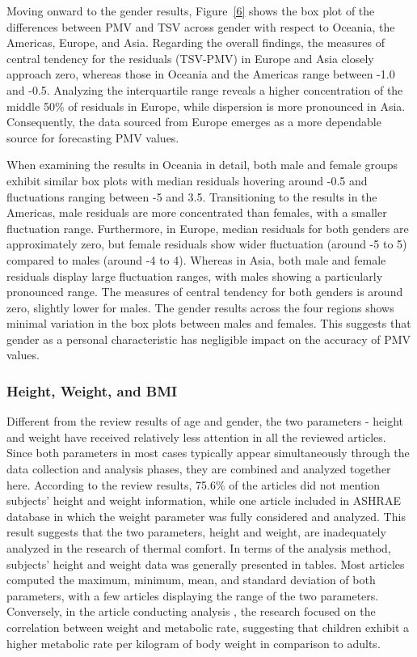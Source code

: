 \documentclass[final,3p,times,12pt]{elsarticle}
\begin{document}
Moving onward to the gender results, Figure~\ref{6} shows the box plot of the differences between PMV and TSV across gender with respect to Oceania, the Americas, Europe, and Asia. Regarding the overall findings, the measures of central tendency for the residuals (TSV-PMV) in Europe and Asia closely approach zero, whereas those in Oceania and the Americas range between -1.0 and -0.5. Analyzing the interquartile range reveals a higher concentration of the middle 50\% of residuals in Europe, while dispersion is more pronounced in Asia. Consequently, the data sourced from Europe emerges as a more dependable source for forecasting PMV values.

When examining the results in Oceania in detail, both male and female groups exhibit similar box plots with median residuals hovering around -0.5 and fluctuations ranging between -5 and 3.5. Transitioning to the results in the Americas, male residuals are more concentrated than females, with a smaller fluctuation range. Furthermore, in Europe, median residuals for both genders are approximately zero, but female residuals show wider fluctuation (around -5 to 5) compared to males (around -4 to 4). Whereas in Asia, both male and female residuals display large fluctuation ranges, with males showing a particularly pronounced range. The measures of central tendency for both genders is around zero, slightly lower for males. The gender results across the four regions shows minimal variation in the box plots between males and females. This suggests that gender as a personal characteristic has negligible impact on the accuracy of PMV values.

\subsubsection{Height, Weight, and BMI}

Different from the review results of age and gender, the two parameters - height and weight have received relatively less attention in all the reviewed articles. Since both parameters in most cases typically appear simultaneously through the data collection and analysis phases, they are combined and analyzed together here. According to the review results, 75.6\% of the articles did not mention subjects’ height and weight information, while one article included in ASHRAE database in which the weight parameter was fully considered and analyzed. This result suggests that the two parameters, height and weight, are inadequately analyzed in the research of thermal comfort. In terms of the analysis method, subjects’ height and weight data was generally presented in tables. Most articles \cite{dedearFieldExperimentsOccupant,kwokThermalComfortJapanese2003,molinaFieldStudyOccupant} computed the maximum, minimum, mean, and standard deviation of both parameters, with a few articles \cite{zhangThermalComfortPeople2020,baePredictingIndoorThermal2017} displaying the range of the two parameters. Conversely, in the article conducting analysis \cite{teliNaturallyVentilatedClassrooms2012}, the research focused on the correlation between weight and metabolic rate, suggesting that children exhibit a higher metabolic rate per kilogram of body weight in comparison to adults.
\end{document}
